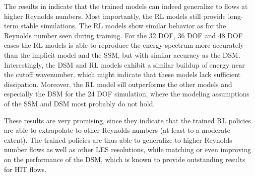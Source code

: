 The results in  indicate that the trained models can indeed generalize to flows at higher Reynolds numbers.
Most importantly, the RL models still provide long-term stable simulations.
The RL models show similar behavior as for the Reynolds number seen during training. 
For the 32 DOF, 36 DOF and 48 DOF cases the RL models is able to reproduce the energy spectrum more accurately than the implicit model and the SSM, but with similar accuracy as the DSM. 
Interestingly, the DSM and RL models exhibit a similar buildup of energy near the cutoff wavenumber, which might indicate that these models lack sufficient dissipation.
Moreover, the RL model sill outperforms the other models and especially the DSM for the 24 DOF simulation, where the modeling assumptions of the SSM and DSM most probably do not hold.

These results are very promising, since they indicate that the trained RL policies are able to extrapolate to other Reynolds numbers (at least to a moderate extent).
The trained policies are thus able to generalize to higher Reynolds number flows as well as other LES resolutions, while matching or even improving on the performance of the DSM, which is known to provide outstanding results for HIT flows.
